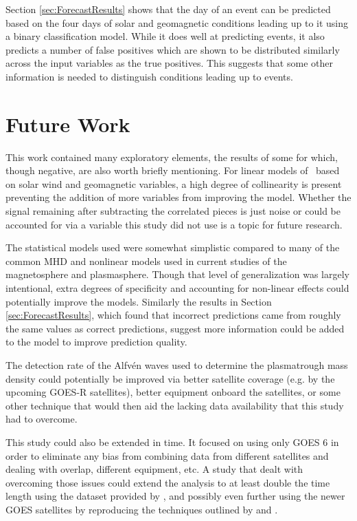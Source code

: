 Section \ref{sec:ForecastResults} shows that the day of an event can be predicted based on the four days of solar and geomagnetic conditions leading up to it using a binary classification model. While it does well at predicting events, it also predicts a number of false positives which are shown to be distributed similarly across the input variables as the true positives.  This suggests that some other information is needed to distinguish conditions leading up to events.



\section{Future Work}

This work contained many exploratory elements, the results of some for which, though negative, are also worth briefly mentioning. For linear models of \req\ based on solar wind and geomagnetic variables, a high degree of collinearity is present preventing the addition of more variables from improving the model. Whether the signal remaining after subtracting the correlated pieces is just noise or could be accounted for via a variable this study did not use is a topic for future research.

The statistical models used were somewhat simplistic compared to many of the common MHD and nonlinear models used in current studies of the magnetosphere and plasmasphere.  Though that level of generalization was largely intentional, extra degrees of specificity and accounting for non-linear effects could potentially improve the models. Similarly the results in Section \ref{sec:ForecastResults}, which found that incorrect predictions came from roughly the same values as correct predictions, suggest more information could be added to the model to improve prediction quality.

The detection rate of the Alfvén waves used to determine the plasmatrough mass density could potentially be improved via better satellite coverage (e.g. by the upcoming GOES-R satellites), better equipment onboard the satellites, or some other technique that would then aid the lacking data availability that this study had to overcome. 

This study could also be extended in time. It focused on using only GOES 6 in order to eliminate any bias from combining data from different satellites and dealing with overlap, different equipment, etc. A study that dealt with overcoming those issues could extend the analysis to at least double the time length using the dataset provided by \cite{Denton}, and possibly even further using the newer GOES satellites by reproducing the techniques outlined by \cite{Takahashi2006MassDensityInferred} and \cite{Kondrashov2014ReconstructionOfGaps}. 